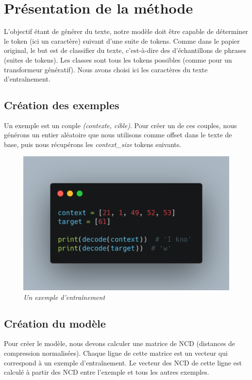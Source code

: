 \documentclass[12pt]{article}
\begin{document}
\newpage

\section{Présentation de la méthode}
L'objectif étant de générer du texte, notre modèle doit être capable de déterminer le token (ici un caractère) suivant d'une suite de tokens. Comme dans le papier original, le but est de classifier du texte, c'est-à-dire des d'échantillons de phrases (suites de tokens). Les classes sont tous les tokens possibles (comme pour un transformeur génératif). Nous avons choisi ici les caractères du texte d'entraînement.


\subsection{Création des exemples}
Un exemple est un couple \textit{(contexte, cible)}. Pour créer un de ces couples, nous générons un entier aléatoire que nous utilisons comme offset dans le texte de base, puis nous récupérons les \textit{context\_size} tokens suivants. 

\begin{figure}[h]
	\centering
    \includegraphics[scale=0.4]{assets/context_target.png}
    \caption{\textit{Un exemple d'entraînement}}
    \label{fig:training_example_example}
\end{figure}

\subsection{Création du modèle}
Pour créer le modèle, nous devons calculer une matrice de NCD (distances de compression normalisées). Chaque ligne de cette matrice est un vecteur qui correspond à un exemple d'entraînement. Le vecteur des NCD de cette ligne est calculé à partir des NCD entre l'exemple et tous les autres exemples.
\end{document}
